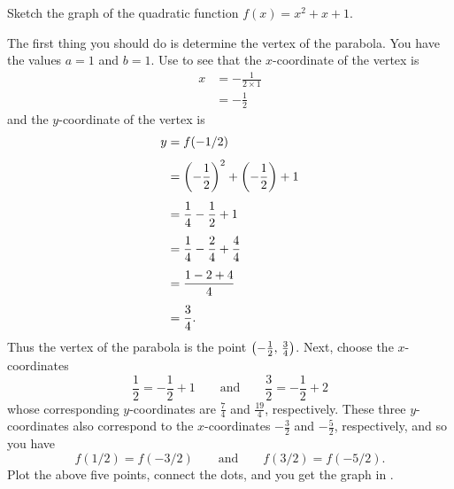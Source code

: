 \documentclass[a4paper,oneside,12pt]{article}
\begin{document}
\begin{example}
\label{ex:quadratic_graph_a1_b1_c1}
Sketch the graph of the quadratic function $f(x) = x^2 + x + 1$.
\end{example}

\begin{solution}
The first thing you should do is determine the vertex of the parabola.
You have the values $a = 1$ and $b = 1$.  Use
 to see that the
$x$-coordinate of the vertex is
\begin{align*}
x
&=
-\frac{1}{2 \times 1} \\[4pt]
&=
-\frac{1}{2}
\end{align*}
and the $y$-coordinate of the vertex is
\begin{align*}
y
&=
f(-1/2) \\[4pt]
&=
\parenthesis*{-\frac{1}{2}}^2 + \parenthesis*{-\frac{1}{2}} + 1 \\[4pt]
&=
\frac{1}{4} - \frac{1}{2} + 1 \\[4pt]
&=
\frac{1}{4} - \frac{2}{4} + \frac{4}{4} \\[4pt]
&=
\frac{1 - 2 + 4}{4} \\[4pt]
&=
\frac{3}{4}.
\end{align*}
Thus the vertex of the parabola is the point
$\tuple{-\frac{1}{2}}{\frac{3}{4}}$.  Next, choose the $x$-coordinates
\begin{equation}
\label{eqn:a1_b1_c1_x_coordinates}
\frac{1}{2} = -\frac{1}{2} + 1
\qquad
\text{and}
\qquad
\frac{3}{2} = -\frac{1}{2} + 2
\end{equation}
whose corresponding $y$-coordinates are $\frac{7}{4}$ and
$\frac{19}{4}$, respectively.  These three $y$-coordinates also
correspond to the $x$-coordinates $-\frac{3}{2}$ and $-\frac{5}{2}$,
respectively, and so you have
\[
f(1/2) = f(-3/2)
\qquad
\text{and}
\qquad
f(3/2) = f(-5/2).
\]
Plot the above five points, connect the dots, and you get the graph
in .
\end{solution}
\end{document}
